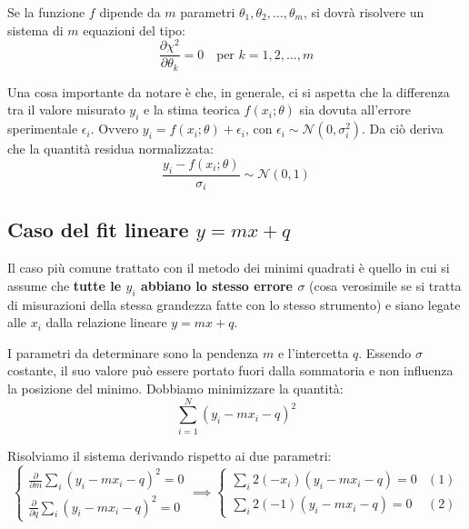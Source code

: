 \documentclass[openany,a4paper,12pt]{book}
\theoremstyle{remark}
\begin{document}
Se la funzione $f$ dipende da $m$ parametri $\theta_1, \theta_2, \dots, \theta_m$, si dovrà risolvere un sistema di $m$ equazioni del tipo:
\begin{equation}
    \frac{\partial \chi^2}{\partial \theta_k} = 0 \quad \text{per } k=1,2, \dots, m
\end{equation}

Una cosa importante da notare è che, in generale, ci si aspetta che la differenza tra il valore misurato $y_i$ e la stima teorica $f(x_i; \theta)$ sia dovuta all'errore sperimentale $\epsilon_i$. Ovvero $y_i = f(x_i; \theta) + \epsilon_i$, con $\epsilon_i \sim \mathcal{N}(0, \sigma_i^2)$. Da ciò deriva che la quantità residua normalizzata:
\begin{equation}
    \frac{y_i - f(x_i; \theta)}{\sigma_i} \sim \mathcal{N}(0, 1)
    \label{eq:gaussiana_chi}
\end{equation}

\subsection{Caso del fit lineare \texorpdfstring{$y = mx + q$}{}}
Il caso più comune trattato con il metodo dei minimi quadrati è quello in cui si assume che \textbf{tutte le $y_i$ abbiano lo stesso errore $\sigma$} (cosa verosimile se si tratta di misurazioni della stessa grandezza fatte con lo stesso strumento) e siano legate alle $x_i$ dalla relazione lineare $y = mx + q$.

I parametri da determinare sono la pendenza $m$ e l'intercetta $q$. Essendo $\sigma$ costante, il suo valore può essere portato fuori dalla sommatoria e non influenza la posizione del minimo. Dobbiamo minimizzare la quantità:
\begin{equation}
    \sum_{i=1}^N (y_i - m x_i - q)^2
\end{equation}

Risolviamo il sistema derivando rispetto ai due parametri:
\begin{equation}
    \begin{cases}
        \displaystyle \frac{\partial}{\partial m} \sum_i (y_i - mx_i - q)^2 = 0 \\[3ex]
        \displaystyle \frac{\partial}{\partial q} \sum_i (y_i - mx_i - q)^2 = 0
    \end{cases}
    \implies
    \begin{cases}
        \displaystyle \sum_i 2(-x_i)(y_i - mx_i - q) = 0 & (1) \\[2ex]
        \displaystyle \sum_i 2(-1)(y_i - mx_i - q) = 0  & (2)
    \end{cases}
\end{equation}
\end{document}
